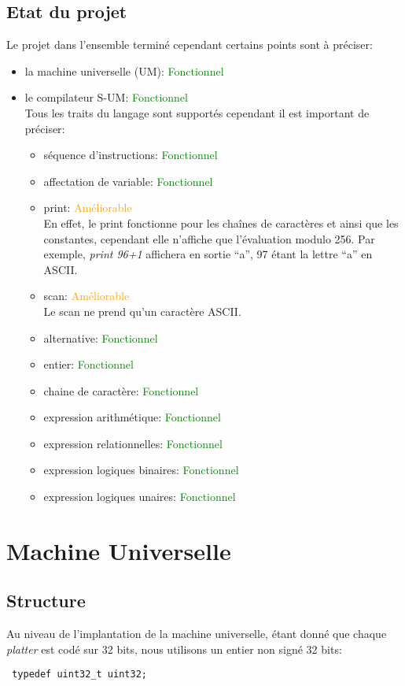 \documentclass[a4paper,12pt]{report}
\begin{document}
\section{Etat du projet}
Le projet dans l'ensemble terminé cependant certains points sont à préciser:
\begin{itemize}
 \item la machine universelle (UM): \textcolor{green}{Fonctionnel}
 \item le compilateur S-UM: \textcolor{green}{Fonctionnel}
 \\ Tous les traits du langage sont supportés cependant il est important de préciser:
 \begin{itemize}
  \item séquence d'instructions: \textcolor{green}{Fonctionnel}
  \item affectation de variable: \textcolor{green}{Fonctionnel}
  \item print: \textcolor{orange}{Améliorable}
  \\ En effet, le print fonctionne pour les chaînes de caractères et ainsi que les constantes, cependant elle n'affiche que l'évaluation
  modulo 256. Par exemple, \textit{print 96+1} affichera en sortie ``a'', 97 étant la lettre ``a'' en ASCII.
  \item scan: \textcolor{orange}{Améliorable}
  \\Le scan ne prend qu'un caractère ASCII.
  \item alternative: \textcolor{green}{Fonctionnel}
  \item entier: \textcolor{green}{Fonctionnel}
  \item chaine de caractère: \textcolor{green}{Fonctionnel}
  \item expression arithmétique: \textcolor{green}{Fonctionnel}
  \item expression relationnelles: \textcolor{green}{Fonctionnel}
  \item expression logiques binaires: \textcolor{green}{Fonctionnel}
  \item expression logiques unaires: \textcolor{green}{Fonctionnel}
 \end{itemize}
\end{itemize}


\chapter{Machine Universelle}
\section{Structure}
Au niveau de l'implantation de la machine universelle, étant donné que chaque \textit{platter} est codé sur 32 bits, nous utilisons
un entier non signé 32 bits:
\begin{verbatim}
 typedef uint32_t uint32;
\end{verbatim}
\end{document}
